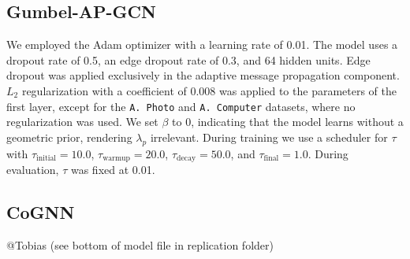 \documentclass{gdl}
\begin{document}
\subsection{Gumbel-AP-GCN}
\label{lab:hyper-gumbel-gcn}
We employed the Adam optimizer with a learning rate of 0.01. The model uses a dropout rate of 0.5, an edge dropout rate of 0.3, and 64 hidden units. Edge dropout was applied exclusively in the adaptive message propagation component. $L_2$ regularization with a coefficient of 0.008 was applied to the parameters of the first layer, except for the \texttt{A. Photo} and \texttt{A. Computer} datasets, where no regularization was used. We set $\beta$ to 0, indicating that the model learns without a geometric prior, rendering $\lambda_p$ irrelevant. During training we use a scheduler for $\tau$ with $\tau_{\text{initial}} = 10.0$, $\tau_{\text{warmup}} = 20.0$, $\tau_{\text{decay}} = 50.0$, and $\tau_{\text{final}} = 1.0$. During evaluation, $\tau$ was fixed at 0.01.

\subsection{CoGNN}
\label{lab:hyper-cogcn}
@Tobias (see bottom of model file in replication folder)
\end{document}
